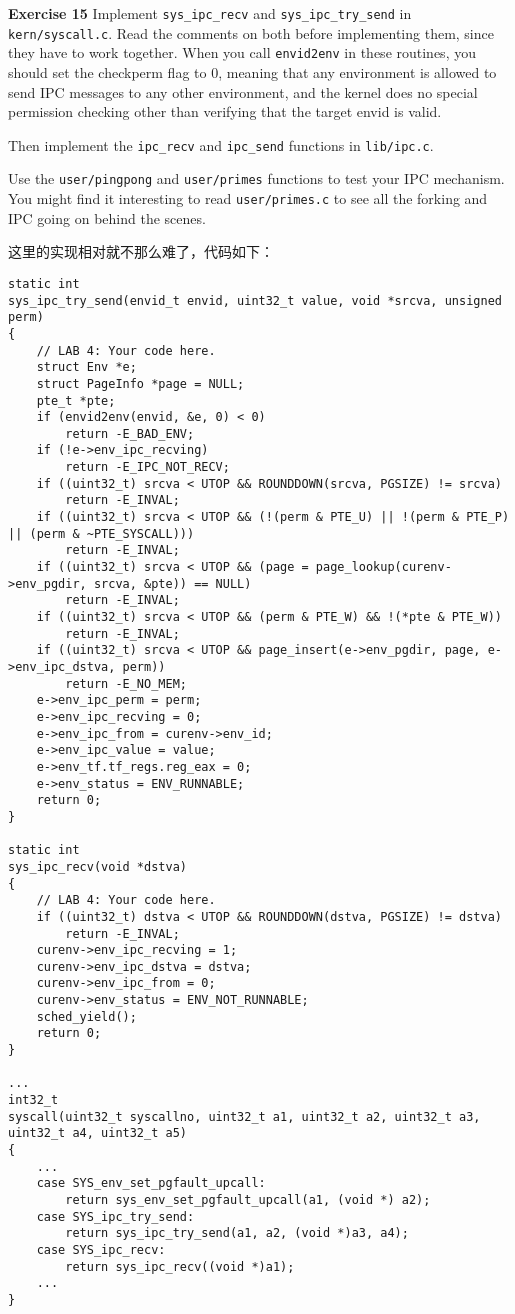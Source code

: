 \documentclass[11pt]{article}
\begin{document}
\begin{framed}
\noindent\textbf{Exercise 15} Implement \lstinline|sys_ipc_recv| and \lstinline|sys_ipc_try_send| in \lstinline|kern/syscall.c|. Read the comments on both before implementing them, since they have to work together. When you call \lstinline|envid2env| in these routines, you should set the checkperm flag to 0, meaning that any environment is allowed to send IPC messages to any other environment, and the kernel does no special permission checking other than verifying that the target envid is valid.

Then implement the \lstinline|ipc_recv| and \lstinline|ipc_send| functions in \lstinline|lib/ipc.c|.

Use the \lstinline|user/pingpong| and \lstinline|user/primes| functions to test your IPC mechanism. You might find it interesting to read \lstinline|user/primes.c| to see all the forking and IPC going on behind the scenes.
\end{framed}
这里的实现相对就不那么难了，代码如下：
\begin{lstlisting}[title=kern/syscall.c]
static int
sys_ipc_try_send(envid_t envid, uint32_t value, void *srcva, unsigned perm)
{
	// LAB 4: Your code here.
    struct Env *e;
    struct PageInfo *page = NULL;
    pte_t *pte;
    if (envid2env(envid, &e, 0) < 0) 
        return -E_BAD_ENV;
    if (!e->env_ipc_recving)
        return -E_IPC_NOT_RECV;
    if ((uint32_t) srcva < UTOP && ROUNDDOWN(srcva, PGSIZE) != srcva)
        return -E_INVAL;
    if ((uint32_t) srcva < UTOP && (!(perm & PTE_U) || !(perm & PTE_P) || (perm & ~PTE_SYSCALL))) 
        return -E_INVAL;
	if ((uint32_t) srcva < UTOP && (page = page_lookup(curenv->env_pgdir, srcva, &pte)) == NULL)
		return -E_INVAL;
	if ((uint32_t) srcva < UTOP && (perm & PTE_W) && !(*pte & PTE_W)) 
        return -E_INVAL;
	if ((uint32_t) srcva < UTOP && page_insert(e->env_pgdir, page, e->env_ipc_dstva, perm))
        return -E_NO_MEM;
	e->env_ipc_perm = perm;
    e->env_ipc_recving = 0;
    e->env_ipc_from = curenv->env_id;
    e->env_ipc_value = value;
    e->env_tf.tf_regs.reg_eax = 0;
    e->env_status = ENV_RUNNABLE;
    return 0;
}

static int
sys_ipc_recv(void *dstva)
{
	// LAB 4: Your code here.
    if ((uint32_t) dstva < UTOP && ROUNDDOWN(dstva, PGSIZE) != dstva)
        return -E_INVAL;
	curenv->env_ipc_recving = 1;
    curenv->env_ipc_dstva = dstva;
    curenv->env_ipc_from = 0;
    curenv->env_status = ENV_NOT_RUNNABLE;
    sched_yield();
	return 0;
}

...
int32_t
syscall(uint32_t syscallno, uint32_t a1, uint32_t a2, uint32_t a3, uint32_t a4, uint32_t a5)
{
	...
    case SYS_env_set_pgfault_upcall:
        return sys_env_set_pgfault_upcall(a1, (void *) a2);
    case SYS_ipc_try_send:
        return sys_ipc_try_send(a1, a2, (void *)a3, a4);
    case SYS_ipc_recv:
        return sys_ipc_recv((void *)a1);
	...
}
\end{lstlisting}
\end{document}
